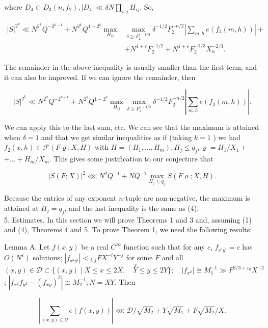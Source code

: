 \documentclass[10pt]{article}
\begin{document}
where $D_{4} \subset D_{3}\left(n, f_{2}\right),\left|D_{4}\right| \ll \delta N \prod_{i, j} H_{i j}$. So,

$$
\begin{aligned}
|S|^{2^{k}} \ll N^{2^{k}} Q^{-2^{k-1}}+N^{2^{k}} Q^{1-2^{k}} \max _{H_{i j}} & \max _{\delta \geqslant F_{2}^{e-1 / 3}} \delta^{-1 / 2} F_{2}^{-n / 2}\left|\sum_{m, h} e\left(f_{3}(m, h)\right)\right|+ \\
& +N^{1+\varepsilon} F_{2}^{-1 / 2}+N^{1+\varepsilon} F_{2}^{-1 / 3} X_{n}^{-2 / 3} .
\end{aligned}
$$

The remainder in the above inequality is usually smaller than the first term, and it can also be improved. If we can ignore the remainder, then

$$
|S|^{2^{k}} \ll N^{2^{k}} Q^{-2^{k-1}}+N^{2^{k}} Q^{1-2^{k}} \max _{H_{i j}} \max _{\delta \geqslant F_{2}^{\varepsilon-1 / 3}} \delta^{-1 / 2} F_{2}^{-n / 2}\left|\sum_{m, h} e\left(f_{3}(m, h)\right)\right| .
$$

We can apply this to the last sum, etc. We can see that the maximum is attained when $\delta=1$ and that we get similar inequalities as if (taking $k=1$ ) we had $f_{2}(x, h) \in \mathscr{F}(F \varrho ; X, H)$ with $H=\left(H_{1}, \ldots, H_{m}\right), H_{j} \leqslant q_{j}, \varrho=H_{1} / X_{1}+$ $+\ldots+H_{m} / X_{m}$. This gives some justification to our conjecture that

$$
|S(F ; X)|^{2} \lll N^{2} Q^{-1}+N Q^{-1} \max _{H_{j} \leqslant q_{j}} S(F \varrho ; X, H) .
$$

Because the entries of any exponent $n$-tuple are non-negative, the maximum is attained at $H_{j}=q_{j}$, and the last inequality is the same as (4).\\
5. Estimates. In this section we will prove Theorems 1 and 3 and, assuming (1) and (4), Theorems 4 and 5. To prove Theorem 1, we need the following results:

Lemma A. Let $f(x, y)$ be a real $C^{\infty}$ function such that for any $c$, $f_{x^{i} y^{i}}=c$ has $O\left(N^{\varepsilon}\right)$ solutions; $\left|f_{x^{i} y^{i}}\right|<{ }_{i, j} F X^{-i} Y^{-j}$ for some $F$ and all $(x, y) \in \mathscr{D} \subset\{(x, y) \mid X \leqslant x \leqslant 2 X, \quad \stackrel{x}{Y} \leqslant y \leqslant 2 Y\} ; \quad\left|f_{x^{2}}\right| \cong M_{1}^{-1} \gg F^{2 / 3+\varepsilon_{0}} X^{-2}$; $\left|f_{x^{2}} f_{y^{2}}-\left(f_{x y}\right)^{2}\right| \cong M_{2}^{-1} ; N=X Y$. Then

$$
\left|\sum_{(x, y) \in \mathscr{Q}} e(f(x, y))\right| \lll \mathscr{D} / \sqrt{M_{2}}+Y \sqrt{M_{1}}+F \sqrt{M_{2}} / X .
$$
\end{document}
